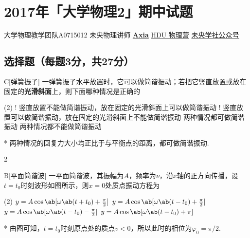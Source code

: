 \chapter{2017年「大学物理2」期中试题}
\date{2022年11月19日}{大学物理教学团队}{A0715012}
{未央物理讲师 \href{https://qm.qq.com/q/UPbGudx8cK}{\textbf{Axia}}}
{}{\href{https://qm.qq.com/q/asJiytD5pC}{HDU 物理营}}
{}{\href{http://weixin.qq.com/r/mhKYgFTEMQlOrRDj90eI}{未央学社公众号}}

\section{选择题（每题3分，共27分）}
\begin{choice}{C}[弹簧振子]
    一弹簧振子水平放置时，它可以做简谐振动；若把它竖直放置或放在固定的\textbf{光滑斜面}上，则下面哪种情况是正确的
\begin{tasks}(2)
    \task! 竖直放置不能做简谐振动，放在固定的光滑斜面上可以做简谐振动
    \task! 竖直放置可以做简谐振动，放在固定的光滑斜面上不能做简谐振动
    \task 两种情况都可做简谐振动
    \task 两种情况都不能做简谐振动
\end{tasks}
\end{choice}
\begin{solution}*
    两种情况的回复力大小均正比于与平衡点的距离，都可做简谐振动.
\end{solution}

\begin{paracol}{2}
\begin{choice}{B}[平面简谐波]
    一平面简谐波，其振幅为$A$，频率为$\nu$，沿$x$轴的正方向传播，设$t=t_0$时刻波形如图所示，则$x=0$处质点振动方程为
    \begin{tasks}(2)
        \task $y=A\cos{\ab[\omega\ab(t+t_0)+\frac{\pi}{2}]}$
        \task $y=A\cos{\ab[\omega\ab(t-t_0)+\frac{\pi}{2}]}$
        \task $y=A\cos{\ab[\omega\ab(t-t_0)-\frac{\pi}{2}]}$
        \task $y=A\cos{\ab[\omega\ab(t-t_0)+\pi]}$
    \end{tasks}
\end{choice}
\switchcolumn\centering
\vfill
{}
\vfill
\end{paracol}
\begin{solution}*
    由图可知，$t=t_0$时刻原点处的质点$v<0$，所以此时的相位为$\varphi_0=\pi/2$.
\end{solution}

